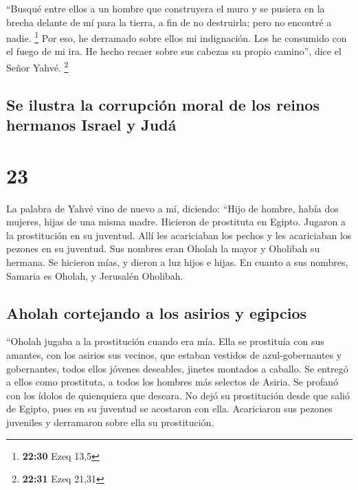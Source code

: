  ``Busqué entre ellos a un hombre que construyera el muro
y se pusiera en la brecha delante de mí para la tierra, a fin de no
destruirla; pero no encontré a nadie. \footnote{\textbf{22:30} Ezeq 13,5}
 Por eso, he derramado sobre ellos mi indignación. Los he
consumido con el fuego de mi ira. He hecho recaer sobre sus cabezas su
propio camino'', dice el Señor Yahvé. \footnote{\textbf{22:31} Ezeq
  21,31}

\hypertarget{se-ilustra-la-corrupciuxf3n-moral-de-los-reinos-hermanos-israel-y-juduxe1}{%
\subsection{Se ilustra la corrupción moral de los reinos hermanos Israel
y
Judá}\label{se-ilustra-la-corrupciuxf3n-moral-de-los-reinos-hermanos-israel-y-juduxe1}}

\hypertarget{section-22}{%
\section{23}\label{section-22}}

 La palabra de Yahvé vino de nuevo a mí, diciendo:
 ``Hijo de hombre, había dos mujeres, hijas de una misma
madre.  Hicieron de prostituta en Egipto. Jugaron a la
prostitución en su juventud. Allí les acariciaban los pechos y les
acariciaban los pezones en su juventud.  Sus nombres eran
Oholah la mayor y Oholibah su hermana. Se hicieron mías, y dieron a luz
hijos e hijas. En cuanto a sus nombres, Samaria es Oholah, y Jerusalén
Oholibah.

\hypertarget{aholah-cortejando-a-los-asirios-y-egipcios}{%
\subsection{Aholah cortejando a los asirios y
egipcios}\label{aholah-cortejando-a-los-asirios-y-egipcios}}

 ``Oholah jugaba a la prostitución cuando era mía. Ella se
prostituía con sus amantes, con los asirios sus vecinos, 
que estaban vestidos de azul-gobernantes y gobernantes, todos ellos
jóvenes deseables, jinetes montados a caballo.  Se entregó
a ellos como prostituta, a todos los hombres más selectos de Asiria. Se
profanó con los ídolos de quienquiera que deseara.  No
dejó su prostitución desde que salió de Egipto, pues en su juventud se
acostaron con ella. Acariciaron sus pezones juveniles y derramaron sobre
ella su prostitución.

